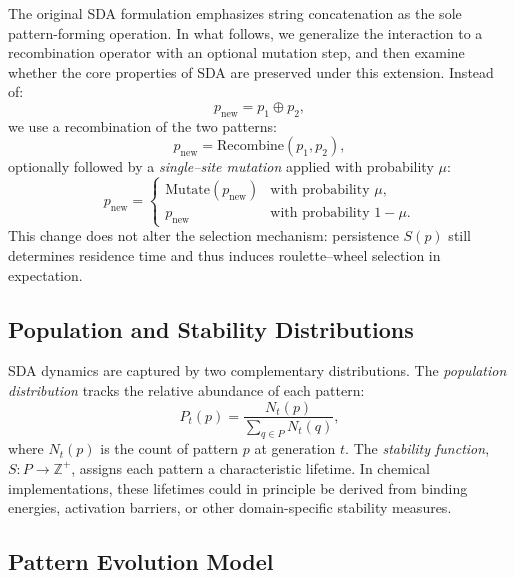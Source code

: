\documentclass[life,article,submit,pdftex,moreauthors]{Definitions/mdpi}
\begin{document}
The original SDA formulation emphasizes string concatenation as the sole pattern-forming operation. In what follows, we generalize the interaction to a recombination operator with an optional mutation step, and then examine whether the core properties of SDA are preserved under this extension. Instead of:
\[
p_{\text{new}} = p_1 \oplus p_2,
\]
we use a recombination of the two patterns:
\[
p_{\text{new}} = \mathrm{Recombine}(p_1,p_2),
\]
optionally followed by a \emph{single–site mutation} applied with probability $\mu$:
\[
p_{\text{new}} =
\begin{cases}
\mathrm{Mutate}(p_{\text{new}}) & \text{with probability } \mu,\\
p_{\text{new}} & \text{with probability } 1-\mu.
\end{cases}
\]
This change does not alter the selection mechanism: persistence 
$S(p)$ still determines
residence time and thus induces roulette–wheel selection in expectation.

\subsection{Population and Stability Distributions}

SDA dynamics are captured by two complementary distributions. 
The \textit{population distribution} tracks the relative abundance of each pattern:
\begin{equation}
P_t(p) = \frac{N_t(p)}{\sum_{q \in P} N_t(q)},
\end{equation}
where $N_t(p)$ is the count of pattern $p$ at generation $t$. 
The \textit{stability function}, $S: P \rightarrow \mathbb{Z}^+$, assigns each pattern a characteristic lifetime. 
In chemical implementations, these lifetimes could in principle be derived from binding energies, activation barriers, or other domain-specific stability measures.

\subsection{Pattern Evolution Model}
\end{document}
